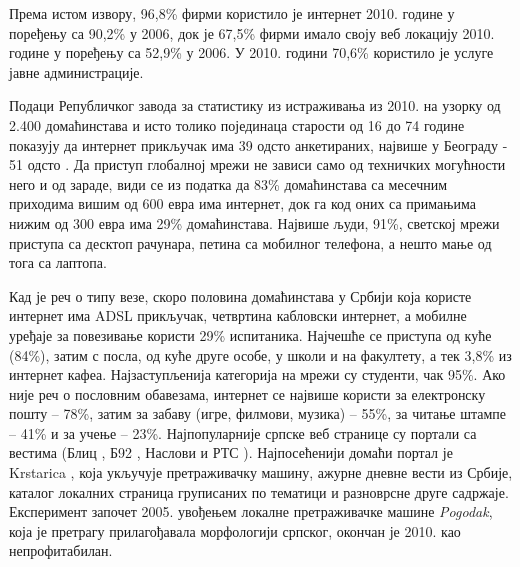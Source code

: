 \begin{multicols}{2}

Према истом извору, 96,8\% фирми користило је интернет 2010. године у поређењу са 90,2\% у  2006, док је 67,5\% фирми имало  своју веб локацију 2010. године у поређењу са 52,9\% у 2006. У 2010. години 70,6\% користило је услуге јавне администрације.

Подаци Републичког завода за статистику из истраживања из 2010. на узорку од 2.400 домаћинстава и исто толико појединаца старости од 16 до 74 године показују да интернет прикључак има 39 одсто анкетираних, највише у Београду - 51 одсто \cite{ICT2010}. Да приступ глобалној мрежи не зависи само од техничких могућности него и од зараде, види се из податка да 83\% домаћинстава са месечним приходима вишим од 600 евра има интернет, док га код оних са примањима нижим од 300 евра има 29\% домаћинстава. Највише људи, 91\%, светској мрежи приступа са десктоп рачунара, петина са мобилног телефона, а нешто мање од тога са лаптопа. 

Кад је реч о типу везе, скоро половина домаћинстава у Србији која користе интернет има ADSL прикључак, четвртина кабловски интернет, а мобилне уређаје за повезивање користи 29\% испитаника. Најчешће се приступа од куће (84\%), затим с посла, од куће друге особе, у школи и на факултету, а  тек 3,8\% из интернет кафеа. Најзаступљенија категорија на мрежи су студенти, чак 95\%. Ако није реч о пословним обавезама, интернет се највише користи за електронску пошту – 78\%, затим за забаву (игре, филмови, музика) – 55\%, за читање штампе – 41\% и за учење – 23\%. Најпопуларније српске веб странице су портали са вестима (Блиц \cite{BLIC}, Б92 \cite{B92}, Наслови \cite{NASLOVI} и РТС \cite{RTS}). Најпосећенији домаћи портал је Krstarica \cite{KRSTARICA},  која укључује претраживачку машину, ажурне дневне вести из Србије, каталог локалних страница груписаних по тематици и разноврсне друге садржаје. Експеримент започет 2005.  увођењем локалне претраживачке машине \textit{Pogodak}, која је претрагу прилагођавала морфологији српског, окончан је 2010. као непрофитабилан. 


\end{multicols}
